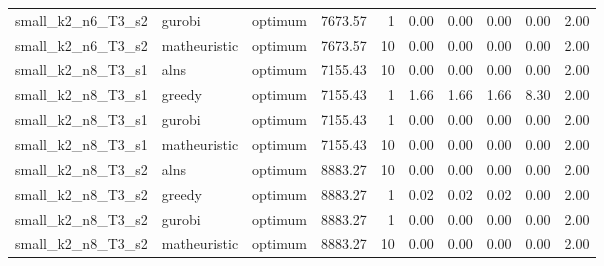 \begin{tabular}{lllrrrrrrr}
small\_k2\_n6\_T3\_s2 & gurobi & optimum & 7673.57 & 1 & 0.00 & 0.00 & 0.00 & 0.00 & 2.00 \\
small\_k2\_n6\_T3\_s2 & matheuristic & optimum & 7673.57 & 10 & 0.00 & 0.00 & 0.00 & 0.00 & 2.00 \\
small\_k2\_n8\_T3\_s1 & alns & optimum & 7155.43 & 10 & 0.00 & 0.00 & 0.00 & 0.00 & 2.00 \\
small\_k2\_n8\_T3\_s1 & greedy & optimum & 7155.43 & 1 & 1.66 & 1.66 & 1.66 & 8.30 & 2.00 \\
small\_k2\_n8\_T3\_s1 & gurobi & optimum & 7155.43 & 1 & 0.00 & 0.00 & 0.00 & 0.00 & 2.00 \\
small\_k2\_n8\_T3\_s1 & matheuristic & optimum & 7155.43 & 10 & 0.00 & 0.00 & 0.00 & 0.00 & 2.00 \\
small\_k2\_n8\_T3\_s2 & alns & optimum & 8883.27 & 10 & 0.00 & 0.00 & 0.00 & 0.00 & 2.00 \\
small\_k2\_n8\_T3\_s2 & greedy & optimum & 8883.27 & 1 & 0.02 & 0.02 & 0.02 & 0.00 & 2.00 \\
small\_k2\_n8\_T3\_s2 & gurobi & optimum & 8883.27 & 1 & 0.00 & 0.00 & 0.00 & 0.00 & 2.00 \\
small\_k2\_n8\_T3\_s2 & matheuristic & optimum & 8883.27 & 10 & 0.00 & 0.00 & 0.00 & 0.00 & 2.00 \\
\bottomrule
\end{tabular}
